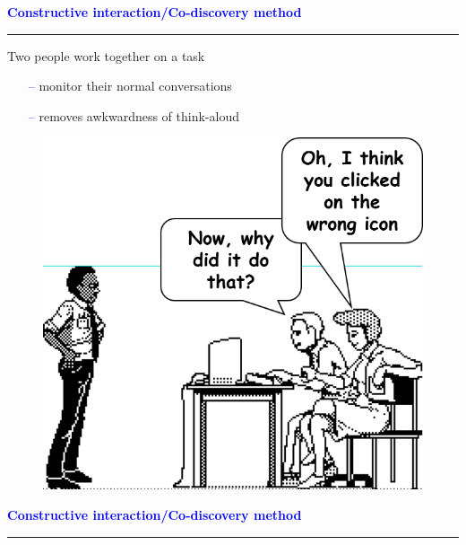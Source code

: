\documentclass[pdf]{beamer}
\begin{document}
{%
{
\begin{frame}
	\vspace{8mm}
	\textcolor{Blue}{\textbf{\large{Constructive interaction/Co-discovery method}}}
    \textcolor{red}{\rule{10cm}{1mm}}
    
    Two people work together on a task \par
    \begin{itemize}
      \item[\textcolor{Blue}{--}] monitor their normal conversations
      \item[\textcolor{Blue}{--}] removes awkwardness of think-aloud
    \end{itemize}
    \bigskip
    \begin{figure}[b]
    	\includegraphics[scale = 0.4, right]{18_Imagine.png}
    \end{figure}
\end{frame}}



{
\begin{frame}
	\vspace{8mm}
	\textcolor{Blue}{\textbf{\large{Constructive interaction/Co-discovery method}}}
    \textcolor{red}{\rule{10cm}{1mm}}


\end{frame}}}
\end{document}
